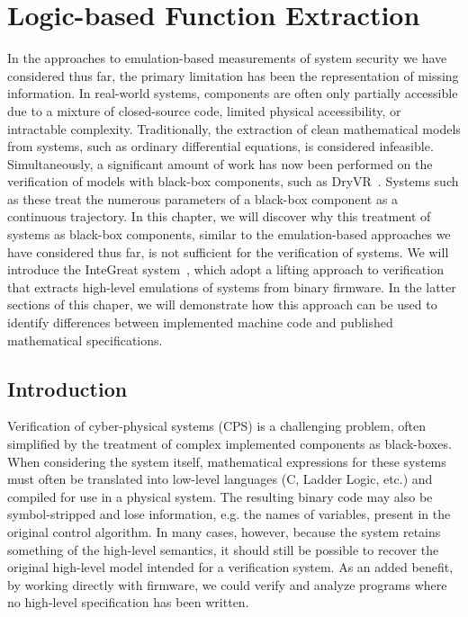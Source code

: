\chapter{Logic-based Function Extraction}
\label{chap:integreat}

In the approaches to emulation-based measurements of system security we have considered thus far, the primary limitation has been the representation of missing information.
In real-world systems, components are often only partially accessible due to a mixture of closed-source code, limited physical accessibility, or intractable complexity.
Traditionally, the extraction of clean mathematical models from systems, such as ordinary differential equations, is considered infeasible.
Simultaneously, a significant amount of work has now been performed on the verification of models with black-box components, such as DryVR~\cite{fan2017dryvr}.
Systems such as these treat the numerous parameters of a black-box component as a continuous trajectory.
In this chapter, we will discover why this treatment of systems as black-box components, similar to the emulation-based approaches we have considered thus far, is not sufficient for the verification of systems.
We will introduce the InteGreat system~\cite{bland2023integreat}, which adopt a lifting approach to verification that extracts high-level emulations of systems from binary firmware.
In the latter sections of this chaper, we will demonstrate how this approach can be used to identify differences between implemented machine code and published mathematical specifications.

\section{Introduction}

Verification of cyber-physical systems (CPS) is a challenging problem, often simplified by the treatment of complex implemented components as black-boxes.
When considering the system itself, mathematical expressions for these systems must often be translated into low-level languages (C, Ladder Logic, etc.) and compiled for use in a physical system.
The resulting binary code may also be symbol-stripped and lose information, e.g. the names of variables, present in the original control algorithm.
In many cases, however, because the system retains something of the high-level semantics, it should still be possible to recover the original high-level model intended for a verification system.
As an added benefit, by working directly with firmware, we could verify and analyze programs where no high-level specification has been written.

